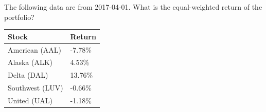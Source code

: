 The following data are from 2017-04-01. What is the equal-weighted return of the portfolio?
\begin{center}
	\begin{tabular}{l|l}
		\textbf{Stock} & \textbf{Return} \\ \hline
		American (AAL) & -7.78\% \\
		Alaska (ALK) & 4.53\% \\
		Delta (DAL) & 13.76\% \\
		Southwest (LUV) & -0.66\% \\
		United (UAL) & -1.18\%\\\hline
	\end{tabular}
\end{center}
